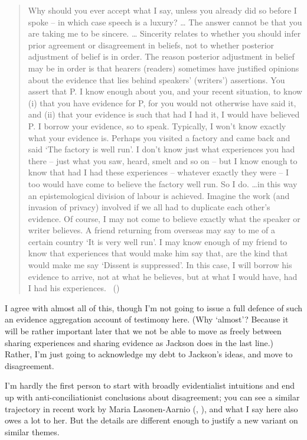 \documentclass[
  10pt,
  letterpaper,
  twoside]{scrbook}
\begin{document}
\begin{quote}
Why should you ever accept what I say, unless you already did so before
I spoke -- in which case speech is a luxury? \ldots{} The answer cannot
be that you are taking me to be sincere. \ldots{} Sincerity relates to
whether you should infer prior agreement or disagreement in beliefs, not
to whether posterior adjustment of belief is in order. The reason
posterior adjustment in belief may be in order is that hearers (readers)
sometimes have justified opinions about the evidence that lies behind
speakers' (writers') assertions. You assert that P. I know enough about
you, and your recent situation, to know (i) that you have evidence for
P, for you would not otherwise have said it, and (ii) that your evidence
is such that had I had it, I would have believed P. I borrow your
evidence, so to speak. Typically, I won't know exactly what your
evidence is. Perhaps you visited a factory and came back and said `The
factory is well run'. I don't know just what experiences you had there
-- just what you saw, heard, smelt and so on -- but I know enough to
know that had I had these experiences -- whatever exactly they were -- I
too would have come to believe the factory well run. So I do. \ldots in
this way an epistemological division of labour is achieved. Imagine the
work (and invasion of privacy) involved if we all had to duplicate each
other's evidence. Of course, I may not come to believe exactly what the
speaker or writer believes. A friend returning from overseas may say to
me of a certain country `It is very well run'. I may know enough of my
friend to know that experiences that would make him say that, are the
kind that would make me say `Dissent is suppressed'. In this case, I
will borrow his evidence to arrive, not at what he believes, but at what
I would have, had I had his experiences.
~()
\end{quote}

I agree with almost all of this, though I'm not going to issue a full
defence of such an evidence aggregation account of testimony here. (Why
`almost'? Because it will be rather important later that we not be able
to move as freely between sharing experiences and sharing evidence as
Jackson does in the last line.) Rather, I'm just going to acknowledge my
debt to Jackson's ideas, and move to disagreement.

I'm hardly the first person to start with broadly evidentialist
intuitions and end up with anti-conciliationist conclusions about
disagreement; you can see a similar trajectory in recent work by Maria
Lasonen-Aarnio (,
), and what I say here also owes
a lot to her. But the details are different enough to justify a new
variant on similar themes.
\end{document}
